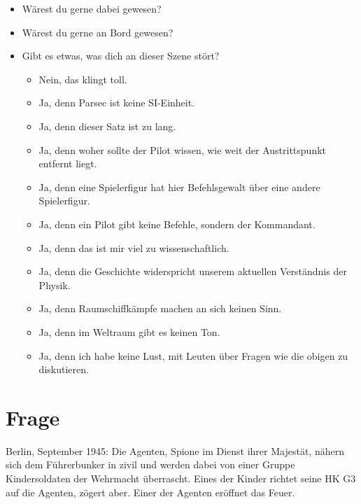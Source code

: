 \documentclass{article}
\newcommand\frage[1]{\section{Frage}\label{#1}}
\begin{document}
\begin{itemize}
\item  Wärest du gerne dabei gewesen?
\item  Wärest du gerne an Bord gewesen?
\item  Gibt es etwas, was dich an dieser Szene stört?
  \begin{itemize}
  \item Nein, das klingt toll.
  \item Ja, denn Parsec ist keine SI-Einheit.
  \item Ja, denn dieser Satz ist zu lang.
  \item Ja, denn woher sollte der Pilot wissen, wie weit der Austrittspunkt entfernt liegt.
  \item Ja, denn eine Spielerfigur hat hier Befehlsgewalt über eine andere Spielerfigur.
  \item Ja, denn ein Pilot gibt keine Befehle, sondern der Kommandant.
  \item Ja, denn das ist mir viel zu wissenschaftlich.
  \item Ja, denn die Geschichte widerspricht unserem aktuellen Verständnis der Physik.
  \item Ja, denn Raumschiffkämpfe machen an sich keinen Sinn.
  \item Ja, denn im Weltraum gibt es keinen Ton.
  \item Ja, denn ich habe keine Lust, mit Leuten über Fragen wie die obigen zu diskutieren.
  \end{itemize}
\end{itemize}


\frage{gutundboese} Berlin, September 1945: Die Agenten, Spione im
Dienst ihrer Majestät, nähern sich dem Führerbunker in zivil und
werden dabei von einer Gruppe Kindersoldaten der Wehrmacht
überrascht. Eines der Kinder richtet seine HK G3 auf die Agenten,
zögert aber. Einer der Agenten eröffnet das Feuer.
\end{document}
